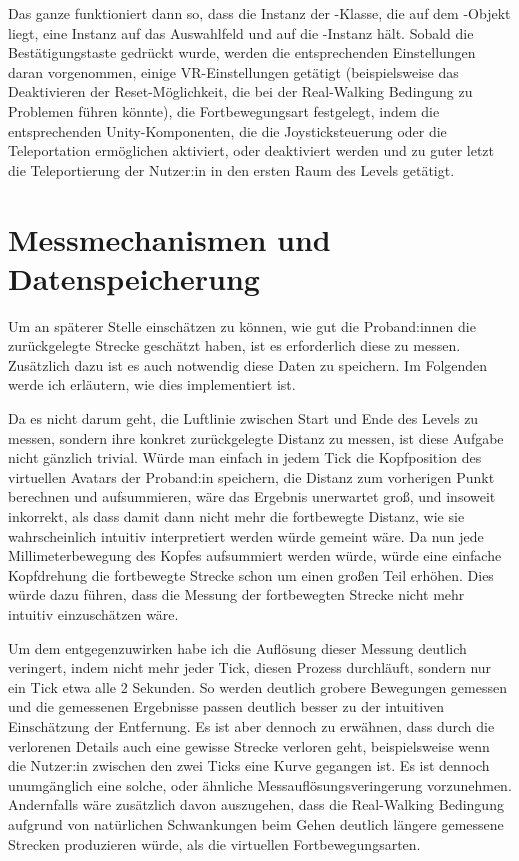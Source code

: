 Das ganze funktioniert dann so, dass die Instanz der -Klasse, die auf dem -Objekt liegt, eine Instanz auf das Auswahlfeld und auf die -Instanz hält. Sobald die Bestätigungstaste gedrückt wurde, werden die entsprechenden Einstellungen daran vorgenommen, einige VR-Einstellungen getätigt (beispielsweise das Deaktivieren der Reset-Möglichkeit, die bei der Real-Walking Bedingung zu Problemen führen könnte), die Fortbewegungsart festgelegt, indem die entsprechenden Unity-Komponenten, die die Joysticksteuerung oder die Teleportation ermöglichen aktiviert, oder deaktiviert werden und zu guter letzt die Teleportierung der Nutzer:in in den ersten Raum des Levels getätigt.

\section{Messmechanismen und Datenspeicherung} \label{sec:measure-distance}
Um an späterer Stelle einschätzen zu können, wie gut die Proband:innen die zurückgelegte Strecke geschätzt haben, ist es erforderlich diese zu messen. Zusätzlich dazu ist es auch notwendig diese Daten zu speichern. Im Folgenden werde ich erläutern, wie dies implementiert ist.

Da es nicht darum geht, die Luftlinie zwischen Start und Ende des Levels zu messen, sondern ihre konkret zurückgelegte Distanz zu messen, ist diese Aufgabe nicht gänzlich trivial. Würde man einfach in jedem Tick die Kopfposition des virtuellen Avatars der Proband:in speichern, die Distanz zum vorherigen Punkt berechnen und aufsummieren, wäre das Ergebnis unerwartet groß, und insoweit inkorrekt, als dass damit dann nicht mehr die fortbewegte Distanz, wie sie wahrscheinlich intuitiv interpretiert werden würde gemeint wäre.
Da nun jede Millimeterbewegung des Kopfes aufsummiert werden würde, würde eine einfache Kopfdrehung die fortbewegte Strecke schon um einen großen Teil erhöhen. Dies würde dazu führen, dass die Messung der fortbewegten Strecke nicht mehr intuitiv einzuschätzen wäre.

Um dem entgegenzuwirken habe ich die Auflösung dieser Messung deutlich veringert, indem nicht mehr jeder Tick, diesen Prozess durchläuft, sondern nur ein Tick etwa alle 2 Sekunden. So werden deutlich grobere Bewegungen gemessen und die gemessenen Ergebnisse passen deutlich besser zu der intuitiven Einschätzung der Entfernung. Es ist aber dennoch zu erwähnen, dass durch die verlorenen Details auch eine gewisse Strecke verloren geht, beispielsweise wenn die Nutzer:in zwischen den zwei Ticks eine Kurve gegangen ist.
Es ist dennoch unumgänglich eine solche, oder ähnliche Messauflösungsveringerung vorzunehmen. Andernfalls wäre zusätzlich davon auszugehen, dass die Real-Walking Bedingung aufgrund von natürlichen Schwankungen beim Gehen deutlich längere gemessene Strecken produzieren würde, als die virtuellen Fortbewegungsarten.

